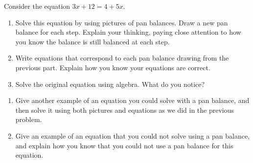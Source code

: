 \documentclass[nooutcomes,noauthor]{ximera}
\begin{document}
\begin{problem}
Consider the equation $3x + 12 = 4 + 5x$.
\begin{enumerate}
	\item Solve this equation by using pictures of pan balances. Draw a new pan balance for each step. Explain your thinking, paying close attention to how you know the balance is still balanced at each step.
	\item Write equations that correspond to each pan balance drawing from the previous part. Explain how you know your equations are correct.
	\item Solve the original equation using algebra. What do you notice?
\end{enumerate}
\end{problem}




\begin{problem}
	\begin{enumerate}
		\item Give another example of an equation you could solve with a pan balance, and then solve it using both pictures and equations as we did in the previous problem.
		\item Give an example of an equation that you could not solve using a pan balance, and explain how you know that you could not use a pan balance for this equation.
	\end{enumerate}
\end{problem}



\newpage
\end{document}
